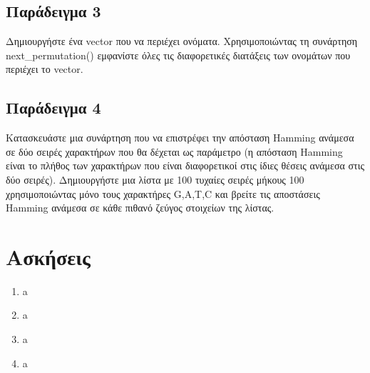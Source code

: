 



\subsection{Παράδειγμα 3}
Δημιουργήστε ένα vector που να περιέχει ονόματα. Χρησιμοποιώντας τη συνάρτηση next\_permutation() εμφανίστε όλες τις διαφορετικές διατάξεις των ονομάτων που περιέχει το vector.





\subsection{Παράδειγμα 4}
Κατασκευάστε μια συνάρτηση που να επιστρέφει την απόσταση Hamming ανάμεσα σε δύο σειρές χαρακτήρων που θα δέχεται ως παράμετρο (η απόσταση Hamming είναι το πλήθος των χαρακτήρων που είναι διαφορετικοί στις ίδιες θέσεις ανάμεσα στις δύο σειρές). Δημιουργήστε μια λίστα με 100 τυχαίες σειρές μήκους 100 χρησιμοποιώντας μόνο τους χαρακτήρες G,A,T,C και βρείτε τις αποστάσεις Hamming ανάμεσα σε κάθε πιθανό ζεύγος στοιχείων της λίστας.

\section{Ασκήσεις}
\begin{enumerate}
\item a
 \item a
\item a
\item a
\end{enumerate}

